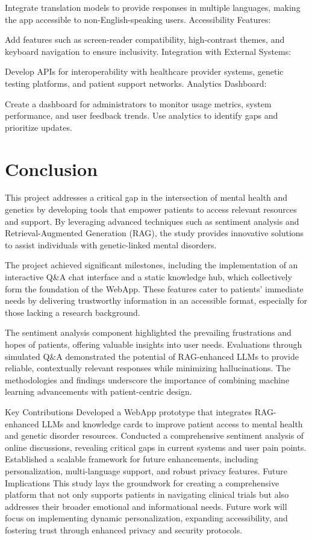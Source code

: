 \documentclass{article} %
\begin{document}
Integrate translation models to provide responses in multiple languages, making the app accessible to non-English-speaking users.
Accessibility Features:

Add features such as screen-reader compatibility, high-contrast themes, and keyboard navigation to ensure inclusivity.
Integration with External Systems:

Develop APIs for interoperability with healthcare provider systems, genetic testing platforms, and patient support networks.
Analytics Dashboard:

Create a dashboard for administrators to monitor usage metrics, system performance, and user feedback trends.
Use analytics to identify gaps and prioritize updates.





\section{Conclusion}

This project addresses a critical gap in the intersection of mental health and genetics by developing tools that empower patients to access relevant resources and support. By leveraging advanced techniques such as sentiment analysis and Retrieval-Augmented Generation (RAG), the study provides innovative solutions to assist individuals with genetic-linked mental disorders.

The project achieved significant milestones, including the implementation of an interactive Q&A chat interface and a static knowledge hub, which collectively form the foundation of the WebApp. These features cater to patients' immediate needs by delivering trustworthy information in an accessible format, especially for those lacking a research background.

The sentiment analysis component highlighted the prevailing frustrations and hopes of patients, offering valuable insights into user needs. Evaluations through simulated Q&A demonstrated the potential of RAG-enhanced LLMs to provide reliable, contextually relevant responses while minimizing hallucinations. The methodologies and findings underscore the importance of combining machine learning advancements with patient-centric design.

Key Contributions
Developed a WebApp prototype that integrates RAG-enhanced LLMs and knowledge cards to improve patient access to mental health and genetic disorder resources.
Conducted a comprehensive sentiment analysis of online discussions, revealing critical gaps in current systems and user pain points.
Established a scalable framework for future enhancements, including personalization, multi-language support, and robust privacy features.
Future Implications
This study lays the groundwork for creating a comprehensive platform that not only supports patients in navigating clinical trials but also addresses their broader emotional and informational needs. Future work will focus on implementing dynamic personalization, expanding accessibility, and fostering trust through enhanced privacy and security protocols.
\end{document}
